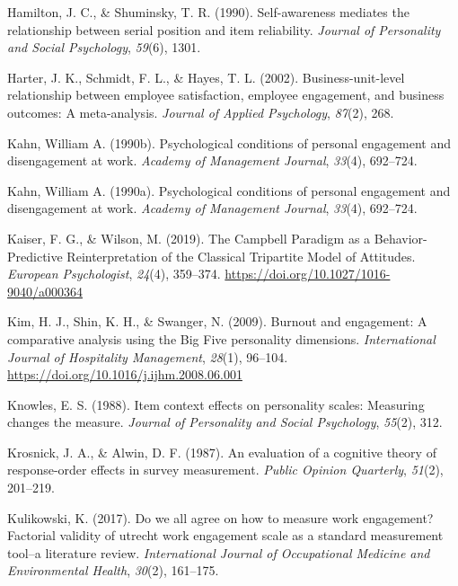 \documentclass[
  man]{apa6}
\newlength{\cslhangindent}
\newlength{\cslentryspacingunit} %
\newenvironment{CSLReferences}[2] %
 {%
  \setlength{\parindent}{0pt}
  \ifodd #1
  \let\oldpar\par
  \def\par{\hangindent=\cslhangindent\oldpar}
  \fi
  \setlength{\parskip}{#2\cslentryspacingunit}
 }%
 {}
\begin{document}
\begin{CSLReferences}{1}{0}
\leavevmode{}%
Hamilton, J. C., \& Shuminsky, T. R. (1990). Self-awareness mediates the relationship between serial position and item reliability. \emph{Journal of Personality and Social Psychology}, \emph{59}(6), 1301.

\leavevmode{}%
Harter, J. K., Schmidt, F. L., \& Hayes, T. L. (2002). Business-unit-level relationship between employee satisfaction, employee engagement, and business outcomes: A meta-analysis. \emph{Journal of Applied Psychology}, \emph{87}(2), 268.

\leavevmode{}%
Kahn, William A. (1990b). Psychological conditions of personal engagement and disengagement at work. \emph{Academy of Management Journal}, \emph{33}(4), 692--724.

\leavevmode{}%
Kahn, William A. (1990a). Psychological conditions of personal engagement and disengagement at work. \emph{Academy of Management Journal}, \emph{33}(4), 692--724.

\leavevmode{}%
Kaiser, F. G., \& Wilson, M. (2019). The {Campbell} {Paradigm} as a {Behavior}-{Predictive} {Reinterpretation} of the {Classical} {Tripartite} {Model} of {Attitudes}. \emph{European Psychologist}, \emph{24}(4), 359--374. \url{https://doi.org/10.1027/1016-9040/a000364}

\leavevmode{}%
Kim, H. J., Shin, K. H., \& Swanger, N. (2009). Burnout and engagement: {A} comparative analysis using the {Big} {Five} personality dimensions. \emph{International Journal of Hospitality Management}, \emph{28}(1), 96--104. \url{https://doi.org/10.1016/j.ijhm.2008.06.001}

\leavevmode{}%
Knowles, E. S. (1988). Item context effects on personality scales: Measuring changes the measure. \emph{Journal of Personality and Social Psychology}, \emph{55}(2), 312.

\leavevmode{}%
Krosnick, J. A., \& Alwin, D. F. (1987). An evaluation of a cognitive theory of response-order effects in survey measurement. \emph{Public Opinion Quarterly}, \emph{51}(2), 201--219.

\leavevmode{}%
Kulikowski, K. (2017). Do we all agree on how to measure work engagement? Factorial validity of utrecht work engagement scale as a standard measurement tool--a literature review. \emph{International Journal of Occupational Medicine and Environmental Health}, \emph{30}(2), 161--175.


\end{CSLReferences}
\end{document}

